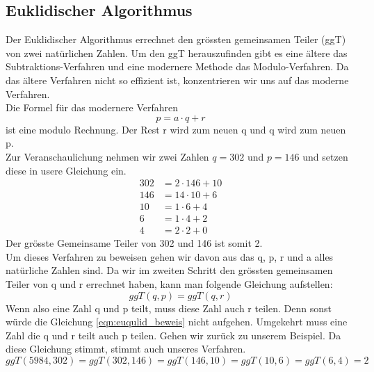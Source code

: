 \subsection{Euklidischer Algorithmus}
Der Euklidischer Algorithmus errechnet den grössten gemeinsamen Teiler (ggT) von zwei natürlichen Zahlen. Um den ggT herauszufinden gibt es eine ältere das Subtraktions-Verfahren und eine modernere Methode das Modulo-Verfahren. Da das ältere Verfahren nicht so effizient ist, konzentrieren wir uns auf das moderne Verfahren.\\
Die Formel für das modernere Verfahren 
%
\begin{equation}
  p = a \cdot q + r
\end{equation}
%
ist eine modulo Rechnung. Der Rest r wird zum neuen q und q wird zum neuen p. \\
Zur Veranschaulichung nehmen wir zwei Zahlen $q = 302$ und $p = 146$ und setzen diese in usere Gleichung ein.
%
\begin{equation}
  \begin{split}
    302 & = 2 \cdot 146 + 10 \\
    146 & = 14 \cdot 10 + 6  \\
    10 & = 1 \cdot 6 + 4  \\
    6 & = 1 \cdot 4 + 2  \\
    4 & = 2 \cdot 2 + 0
    \label{eqn:euqulid_beweis}
  \end{split}
\end{equation}
%
Der grösste Gemeinsame Teiler von 302 und 146 ist somit 2. \\[2ex]
Um dieses Verfahren zu beweisen gehen wir davon aus das q, p, r und a alles natürliche Zahlen sind. Da wir im zweiten Schritt den grössten gemeinsamen Teiler von q und r errechnet haben, kann man folgende Gleichung aufstellen:
%
\begin{equation}
  ggT(q,p) = ggT(q,r)
\end{equation}
%
Wenn also eine Zahl q und p teilt, muss diese Zahl auch r teilen. Denn sonst würde die Gleichung \ref{eqn:euqulid_beweis} nicht aufgehen. Umgekehrt muss eine Zahl die q und r teilt auch p teilen. Gehen wir zurück zu unserem Beispiel. Da diese Gleichung stimmt, stimmt auch unseres Verfahren.
%
\begin{equation*}
 ggT(5984,302) = ggT(302,146) = ggT(146,10) = ggT(10,6) = ggT(6,4) = 2 
\end{equation*}
%
